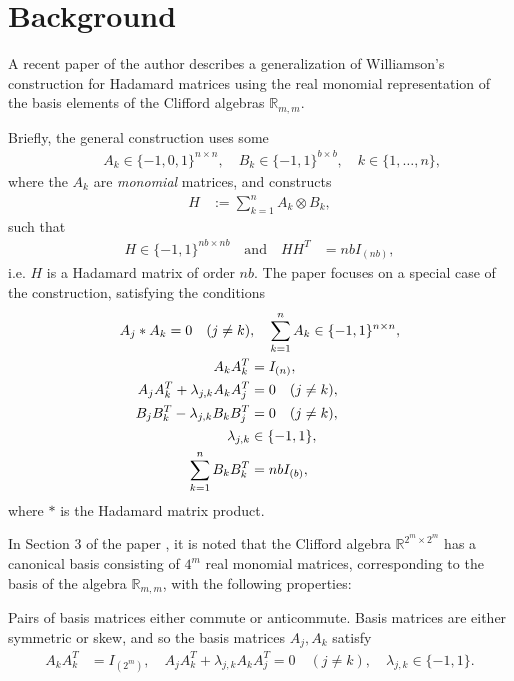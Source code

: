 \documentclass[12pt,a4paper]{article}
\newcommand{\mb}[1]{\mathbb{#1}}
\newcommand{\R}{\mb{R}}
\begin{document}
\section{Background}\label{sec-Background}
A recent paper of the author \cite{Leo14Constructions} describes a generalization of
Williamson's construction for Hada\-mard matrices \cite{Wil44}
using the real monomial representation of the basis elements of the Clifford algebras $\R_{m,m}$.

Briefly, the general construction uses some
\begin{align*}
%
\quad &A_k \in \{-1,0,1\}^{n \times n}, \quad B_k \in \{-1,1\}^{b \times b}, 
\quad k \in \{1,\ldots,n\},
% 
\end{align*}
%
where the $A_k$ are \emph{monomial} matrices,
and constructs
%
\begin{align}
%
H &:= \sum_{k=1}^n A_k \otimes B_k,
\tag{H0}
%
\end{align}
%
such that
%
\begin{align}
%
H \in \{-1,1\}^{n b \times n b}
\quad
\text{and}
\quad
H H^T &= n b I_{(n b)},
\tag{H1}
%
\end{align}
%
i.e. $H$ is a Hada\-mard matrix of order $n b$.
The paper \cite{Leo14Constructions} focuses on a special case of the construction, 
satisfying the conditions
%
\begin{align}
%
 A_j \ast A_k = 0 \quad (j \neq k)&, \quad \sum_{k=1}^n A_k \in \{-1,1\}^{n \times n},
\notag
\\
 A_k A_k^T &= I_{(n)},
\notag
\\
 A_j A_k^T + \lambda_{j,k} A_k A_j^T &= 0 \quad (j \neq k),
\label{constructions-4}
\\
 B_j B_k^T - \lambda_{j,k} B_k B_j^T &= 0 \quad (j \neq k),
\notag
\\
 \lambda_{j,k} &\in \{-1,1\},
\notag
\\
\sum_{k=1}^n  B_k B_k^T &= n b I_{(b)},
\notag
%
\end{align}
%
where $\ast$ is the Hada\-mard matrix product.

In Section 3 of the paper  \cite{Leo14Constructions},
it is noted that the Clifford algebra $\R^{2^m \times 2^m}$ has a canonical basis consisting of $4^m$ real monomial matrices,
corresponding to the basis of the algebra $\R_{m,m}$, with the following properties:

Pairs of basis matrices either commute or anticommute.
Basis matrices are either symmetric or skew,
and so the basis matrices $A_j, A_k$ satisfy
%
\begin{align}
%
 A_k A_k^T &= I_{(2^m)},
\quad
 A_j A_k^T + \lambda_{j,k} A_k A_j^T = 0 \quad (j \neq k),
\quad
\lambda_{j,k} \in \{-1,1\}.
%
\label{A-property-1}
\end{align}
\end{document}
